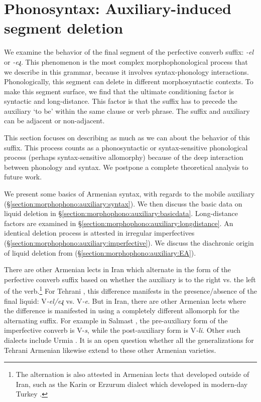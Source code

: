  
		
	\section{Phonosyntax: Auxiliary-induced segment deletion}\label{section:morphophono:auxiliary}


We examine the behavior of the final segment of the perfective converb suffix: \textit{-el} or \textit{-eɻ}. This phenomenon is the most complex morphophonological process that we describe in this grammar, because it involves  syntax-phonology interactions. Phonologically, this segment   can delete in different morphosyntactic contexts. To make this segment surface, we find that the ultimate conditioning factor is syntactic and long-distance. This factor is that the suffix has to precede the auxiliary `to be' within the same clause or verb phrase. The suffix and auxiliary can be adjacent or non-adjacent. 

This section focuses   on describing as much   as we can about the behavior of this suffix.   This process counts as a phonosyntactic or syntax-sensitive phonological process (perhaps syntax-sensitive allomorphy) because of the deep interaction between   phonology and syntax. We postpone a complete theoretical analysis  to future work. 

We present some basics of Armenian syntax, with regards to the mobile auxiliary (\S\ref{section:morphophono:auxiliary:syntax}). We then discuss the basic data on liquid deletion in \S\ref{section:morphophono:auxiliary:basicdata}. Long-distance factors are examined in \S\ref{section:morphophono:auxiliary:longdistance}. An identical deletion process is attested in irregular imperfectives (\S\ref{section:morphophono:auxiliary:imperfective}). We discuss the diachronic origin of liquid deletion from {\seaSEA} (\S\ref{section:morphophono:auxiliary:EA}). 

There are other Armenian lects in Iran which alternate in the form of the perfective converb suffix  based on whether the auxiliary is to the right vs. the left of the verb.\footnote{The alternation  is also attested in Armenian lects that developed outside of Iran, such as the Karin or Erzurum dialect which developed in modern-day Turkey \citep[120]{Bezrukov-2022-DissCaucasusMotionArmenian}. } For Tehrani {\iaIA}, this difference manifests in the presence/absence of the final liquid:   V\textit{-el/eɻ}  vs.   V\textit{-e}. But in Iran, there are other Armenian lects where the difference is manifested in using a completely different allomorph for the alternating suffix. For example in Salmast \citep[53]{Vaux-Salmast}, the pre-auxiliary form of the imperfective converb is V-\textit{s}, while the post-auxiliary form is V\textit{-li}. Other such dialects include Urmia  \citep[275]{Gharibyan-1941-SummaryArmenianDialectology}. It is an open question whether all the  generalizations for Tehrani Armenian likewise extend to these other Armenian varieties.


